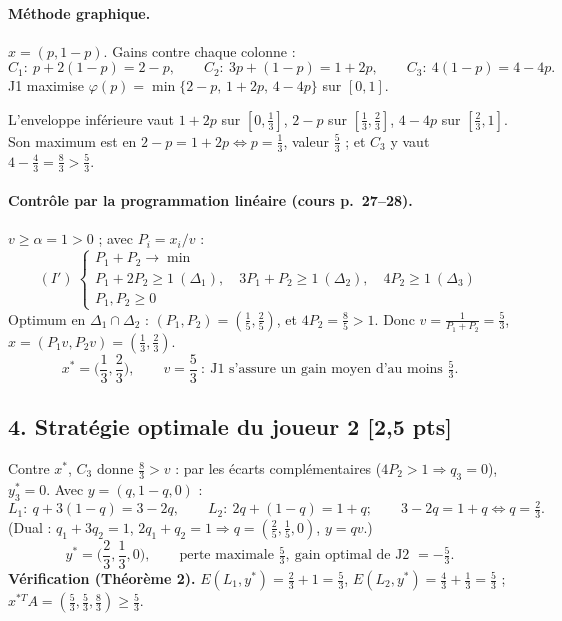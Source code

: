 \documentclass[11pt,a4paper]{article}
\begin{document}
\paragraph{Méthode graphique.} $x=(p,1-p)$. Gains contre chaque colonne :
\[
C_1:\ p+2(1-p)=2-p,\qquad C_2:\ 3p+(1-p)=1+2p,\qquad C_3:\ 4(1-p)=4-4p.
\]
J1 maximise $\varphi(p)=\min\{2-p,\,1+2p,\,4-4p\}$ sur $[0,1]$.
\begin{center}
\end{center}
L'enveloppe inférieure vaut $1+2p$ sur $[0,\frac13]$, $2-p$ sur $[\frac13,\frac23]$, $4-4p$ sur $[\frac23,1]$. Son maximum est en $2-p=1+2p\iff p=\frac13$, valeur $\frac53$ ; et $C_3$ y vaut $4-\frac43=\frac83>\frac53$.

\paragraph{Contrôle par la programmation linéaire (cours p.~27--28).} $v\ge\alpha=1>0$ ; avec $P_i=x_i/v$ :
\[
(I')\ \begin{cases}P_1+P_2\to\min\\ P_1+2P_2\ge1\ (\Delta_1),\quad 3P_1+P_2\ge1\ (\Delta_2),\quad 4P_2\ge1\ (\Delta_3)\\ P_1,P_2\ge0\end{cases}
\]
Optimum en $\Delta_1\cap\Delta_2$ : $(P_1,P_2)=(\frac15,\frac25)$, et $4P_2=\frac85>1$. Donc $v=\frac{1}{P_1+P_2}=\frac53$, $x=(P_1v,P_2v)=(\frac13,\frac23)$.
\[
\boxed{x^*=\Big(\frac13,\frac23\Big),\qquad v=\frac53\ :\ \text{J1 s'assure un gain moyen d'au moins } \tfrac53.}
\]

\subsection*{4. Stratégie optimale du joueur 2 \hfill[2,5 pts]}
Contre $x^*$, $C_3$ donne $\frac83>v$ : par les écarts complémentaires ($4P_2>1\Rightarrow q_3=0$), $y_3^*=0$. Avec $y=(q,1-q,0)$ :
\[
L_1:\ q+3(1-q)=3-2q,\qquad L_2:\ 2q+(1-q)=1+q;\qquad 3-2q=1+q\iff q=\tfrac23.
\]
(Dual : $q_1+3q_2=1$, $2q_1+q_2=1\Rightarrow q=(\frac25,\frac15,0)$, $y=qv$.)
\[
\boxed{y^*=\Big(\frac23,\frac13,0\Big),\qquad \text{perte maximale } \tfrac53,\ \text{gain optimal de J2 } =-\tfrac53.}
\]
\textbf{Vérification (Théorème 2).} $E(L_1,y^*)=\frac23+1=\frac53$, $E(L_2,y^*)=\frac43+\frac13=\frac53$ ; $x^{*T}A=(\frac53,\frac53,\frac83)\ge\frac53$. \checkmark
\end{document}
